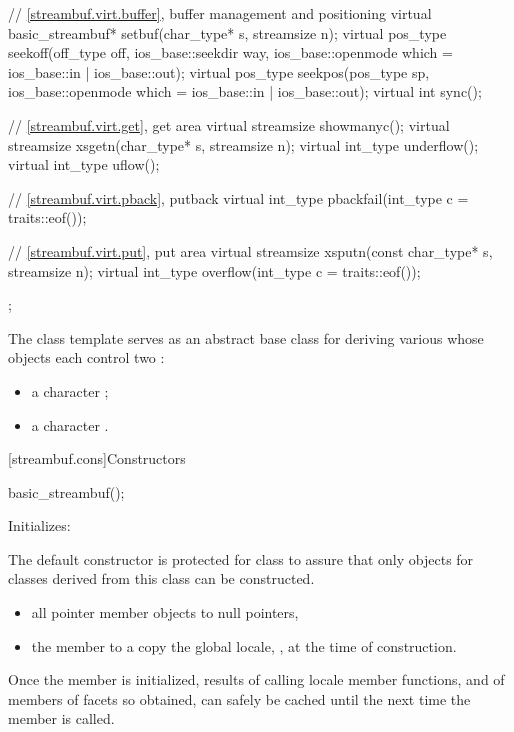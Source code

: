 \begin{codeblock}
{{    // \ref{streambuf.virt.buffer}, buffer management and positioning
    virtual basic_streambuf* setbuf(char_type* s, streamsize n);
    virtual pos_type seekoff(off_type off, ios_base::seekdir way,
                             ios_base::openmode which
                               = ios_base::in | ios_base::out);
    virtual pos_type seekpos(pos_type sp,
                             ios_base::openmode which
                               = ios_base::in | ios_base::out);
    virtual int      sync();

    // \ref{streambuf.virt.get}, get area
    virtual streamsize showmanyc();
    virtual streamsize xsgetn(char_type* s, streamsize n);
    virtual int_type   underflow();
    virtual int_type   uflow();

    // \ref{streambuf.virt.pback}, putback
    virtual int_type   pbackfail(int_type c = traits::eof());

    // \ref{streambuf.virt.put}, put area
    virtual streamsize xsputn(const char_type* s, streamsize n);
    virtual int_type   overflow(int_type c = traits::eof());
  };
}
\end{codeblock}

\pnum
The class template
serves as an abstract base class for deriving various
whose objects each control two
:
\begin{itemize}
\item
a character
;
\item
a character
.
\end{itemize}

[streambuf.cons]{Constructors}

%
\begin{itemdecl}
basic_streambuf();
\end{itemdecl}

\begin{itemdescr}
\pnum
\effects
Initializes:
\begin{footnote}
The default constructor is protected for class
to assure that only objects for classes
derived from this class can be constructed.
\end{footnote}
\begin{itemize}
\item
all pointer member objects to null pointers,
\item
the
member to a copy the global locale,
,
at the time of construction.
\end{itemize}

\pnum
\remarks
Once the
member is initialized, results of calling locale member functions,
and of members of facets so obtained, can safely be cached until the
next time the member
is called.
\end{itemdescr}

